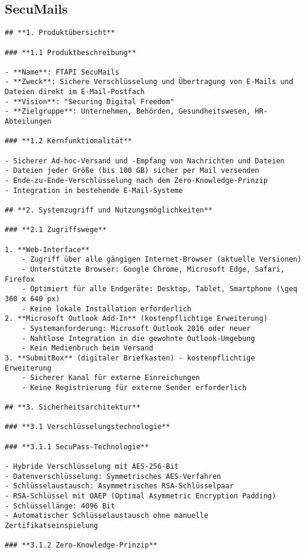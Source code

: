 \subsection{SecuMails}

\begin{Verbatim}[breaklines=true]
## **1. Produktübersicht**

### **1.1 Produktbeschreibung**

- **Name**: FTAPI SecuMails
- **Zweck**: Sichere Verschlüsselung und Übertragung von E-Mails und Dateien direkt im E-Mail-Postfach
- **Vision**: "Securing Digital Freedom"
- **Zielgruppe**: Unternehmen, Behörden, Gesundheitswesen, HR-Abteilungen

### **1.2 Kernfunktionalität**

- Sicherer Ad-hoc-Versand und -Empfang von Nachrichten und Dateien
- Dateien jeder Größe (bis 100 GB) sicher per Mail versenden
- Ende-zu-Ende-Verschlüsselung nach dem Zero-Knowledge-Prinzip
- Integration in bestehende E-Mail-Systeme

## **2. Systemzugriff und Nutzungsmöglichkeiten**

### **2.1 Zugriffswege**

1. **Web-Interface**
    - Zugriff über alle gängigen Internet-Browser (aktuelle Versionen)
    - Unterstützte Browser: Google Chrome, Microsoft Edge, Safari, Firefox
    - Optimiert für alle Endgeräte: Desktop, Tablet, Smartphone (\geq 360 x 640 px)
    - Keine lokale Installation erforderlich
2. **Microsoft Outlook Add-In** (kostenpflichtige Erweiterung)
    - Systemanforderung: Microsoft Outlook 2016 oder neuer
    - Nahtlose Integration in die gewohnte Outlook-Umgebung
    - Kein Medienbruch beim Versand
3. **SubmitBox** (digitaler Briefkasten) - kostenpflichtige Erweiterung
    - Sicherer Kanal für externe Einreichungen
    - Keine Registrierung für externe Sender erforderlich

## **3. Sicherheitsarchitektur**

### **3.1 Verschlüsselungstechnologie**

### **3.1.1 SecuPass-Technologie**

- Hybride Verschlüsselung mit AES-256-Bit
- Datenverschlüsselung: Symmetrisches AES-Verfahren
- Schlüsselaustausch: Asymmetrisches RSA-Schlüsselpaar
- RSA-Schlüssel mit OAEP (Optimal Asymmetric Encryption Padding)
- Schlüssellänge: 4096 Bit
- Automatischer Schlüsselaustausch ohne manuelle Zertifikatseinspielung

### **3.1.2 Zero-Knowledge-Prinzip**


\end{Verbatim}
